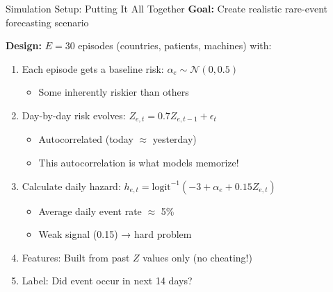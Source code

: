 \documentclass[aspectratio=169]{beamer}
\begin{document}
\begin{frame}{Simulation Setup: Putting It All Together}
\textbf{Goal:} Create realistic rare-event forecasting scenario

\vspace{0.5em}
\textbf{Design:} $E = 30$ episodes (countries, patients, machines) with:

\begin{enumerate}
\item Each episode gets a baseline risk: $\alpha_e \sim \mathcal{N}(0, 0.5)$
\begin{itemize}
\item Some inherently riskier than others
\end{itemize}

\vspace{0.3em}
\item Day-by-day risk evolves: $Z_{e,t} = 0.7 Z_{e,t-1} + \epsilon_t$
\begin{itemize}
\item Autocorrelated (today $\approx$ yesterday)
\item This autocorrelation is what models memorize!
\end{itemize}

\vspace{0.3em}
\item Calculate daily hazard: $h_{e,t} = \text{logit}^{-1}(-3 + \alpha_e + 0.15 Z_{e,t})$
\begin{itemize}
\item Average daily event rate $\approx$ 5\%
\item Weak signal (0.15) → hard problem
\end{itemize}

\vspace{0.3em}
\item Features: Built from past $Z$ values only (no cheating!)
\item Label: Did event occur in next 14 days?
\end{enumerate}
\end{frame}
\end{document}

